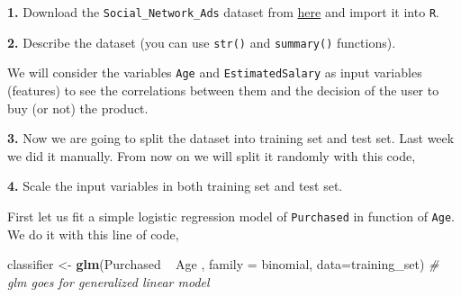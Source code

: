 \documentclass[]{book}
\newenvironment{Shaded}{\begin{snugshade}}{\end{snugshade}}
\newcommand{\KeywordTok}[1]{\textcolor[rgb]{0.13,0.29,0.53}{\textbf{{#1}}}}
\newcommand{\DataTypeTok}[1]{\textcolor[rgb]{0.13,0.29,0.53}{{#1}}}
\newcommand{\DecValTok}[1]{\textcolor[rgb]{0.00,0.00,0.81}{{#1}}}
\newcommand{\FloatTok}[1]{\textcolor[rgb]{0.00,0.00,0.81}{{#1}}}
\newcommand{\StringTok}[1]{\textcolor[rgb]{0.31,0.60,0.02}{{#1}}}
\newcommand{\CommentTok}[1]{\textcolor[rgb]{0.56,0.35,0.01}{\textit{{#1}}}}
\newcommand{\OtherTok}[1]{\textcolor[rgb]{0.56,0.35,0.01}{{#1}}}
\newcommand{\NormalTok}[1]{{#1}}
\begin{document}
\textbf{1.} Download the \texttt{Social\_Network\_Ads} dataset from
\href{datasets/Social_Network_Ads.csv}{here} and import it into
\texttt{R}.

\textbf{2.} Describe the dataset (you can use \texttt{str()} and
\texttt{summary()} functions).

We will consider the variables \texttt{Age} and \texttt{EstimatedSalary}
as input variables (features) to see the correlations between them and
the decision of the user to buy (or not) the product.

\textbf{3.} Now we are going to split the dataset into training set and
test set. Last week we did it manually. From now on we will split it
randomly with this code,

\begin{Shaded}
\end{Shaded}

\textbf{4.} Scale the input variables in both training set and test set.

First let us fit a simple logistic regression model of
\texttt{Purchased} in function of \texttt{Age}. We do it with this line
of code,

\begin{Shaded}
\begin{Highlighting}[]
\NormalTok{classifier <-}\StringTok{ }\KeywordTok{glm}\NormalTok{(Purchased ~}\StringTok{ }\NormalTok{Age , }\DataTypeTok{family =} \NormalTok{binomial, }\DataTypeTok{data=}\NormalTok{training_set)}
\CommentTok{# glm goes for generalized linear model}
\end{Highlighting}
\end{Shaded}
\end{document}
